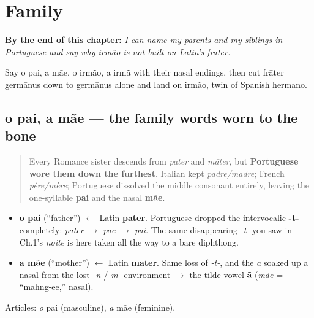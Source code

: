 
\chapter{Family}
\label{ch:pt-family}

\begin{chapteropening}
\textbf{By the end of this chapter:} \emph{I can name my parents and my siblings in Portuguese and say why irmão is not built on Latin's frater.}

Say o pai, a mãe, o irmão, a irmã with their nasal endings, then cut frāter germānus down to germānus alone and land on irmão, twin of Spanish hermano.
\end{chapteropening}

\section[o pai, a mãe]{o pai, a mãe — the family words worn to the bone}

\label{lesson:PT-C10-pais}



\begin{quote}
Every Romance sister descends from \emph{pater} and \emph{māter}, but \textbf{Portuguese wore them down the furthest}. Italian kept \emph{padre/madre}; French \emph{père/mère}; Portuguese dissolved the middle consonant entirely, leaving the one-syllable \textbf{pai} and the nasal \textbf{mãe}.
\end{quote}

\begin{cousinweb}
\begin{itemize}
\raggedright
  \item \textbf{o pai} (\textquotedblleft{}father\textquotedblright{}) $\leftarrow$ Latin \textbf{pater}. Portuguese dropped the intervocalic \textbf{-t-} completely: \emph{pater $\to$ pae $\to$ pai}. The same disappearing-\emph{-t-} you saw in Ch.1's \emph{noite} is here taken all the way to a bare diphthong.
  \item \textbf{a mãe} (\textquotedblleft{}mother\textquotedblright{}) $\leftarrow$ Latin \textbf{māter}. Same loss of \emph{-t-}, and the \emph{a} soaked up a nasal from the lost \emph{-n-}/\emph{-m-} environment $\to$ the tilde vowel \textbf{ã} (\emph{mãe} = \textquotedblleft{}mahng-ee,\textquotedblright{} nasal).
\end{itemize}

Articles: \emph{o} pai (masculine), \emph{a} mãe (feminine).
\end{cousinweb}

